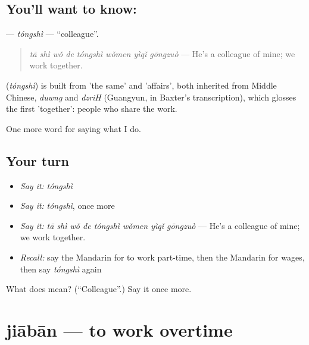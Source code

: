 \subsection*{You'll want to know: }
\textbf{} — \emph{tóngshì} — \textquotedblleft{}colleague\textquotedblright{}.

\begin{quote}
\textbf{} \emph{tā shì wǒ de tóngshì wǒmen yìqǐ gōngzuò} — He's a colleague of mine; we work together.
\end{quote}

\begin{cousinweb}
\textbf{} (\emph{tóngshì}) is built from  'the same' and  'affairs', both inherited from Middle Chinese, \emph{duwng} and \emph{dzriH} (Guangyun, in Baxter's transcription), which glosses the first 'together': people who share the work.
\end{cousinweb}

\begin{grammarlens}[title={What you've built}]
One more word for saying what I do.
\end{grammarlens}

\subsection*{Your turn}
\begin{itemize}
\raggedright
  \item \emph{Say it:} \emph{tóngshì}
  \item \emph{Say it:} \emph{tóngshì}, once more
  \item \emph{Say it:} \emph{tā shì wǒ de tóngshì wǒmen yìqǐ gōngzuò} — He's a colleague of mine; we work together.
  \item \emph{Recall:} say the Mandarin for to work part-time, then the Mandarin for wages, then say \emph{tóngshì} again
\end{itemize}

\begin{tcolorbox}[breakable,colback=teal!4,colframe=teal!35!black,title={Before you move on}]
What does  mean? (\textquotedblleft{}Colleague\textquotedblright{}.) Say it once more.
\end{tcolorbox}
\section[jiābān]{jiābān — to work overtime}

